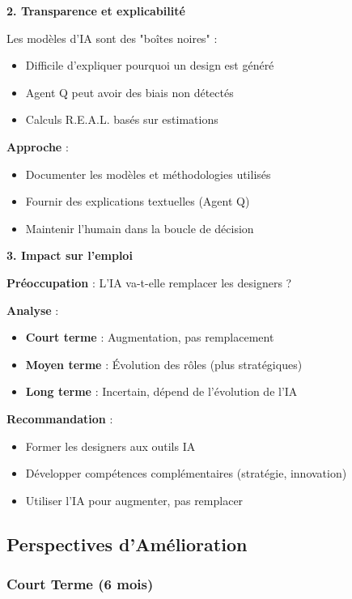 \textbf{2. Transparence et explicabilité}

Les modèles d'IA sont des "boîtes noires" :

\begin{itemize}[leftmargin=*]
    \item Difficile d'expliquer pourquoi un design est généré
    \item Agent Q peut avoir des biais non détectés
    \item Calculs R.E.A.L. basés sur estimations
\end{itemize}

\textbf{Approche} :
\begin{itemize}[leftmargin=*]
    \item Documenter les modèles et méthodologies utilisés
    \item Fournir des explications textuelles (Agent Q)
    \item Maintenir l'humain dans la boucle de décision
\end{itemize}

\textbf{3. Impact sur l'emploi}

\textbf{Préoccupation} : L'IA va-t-elle remplacer les designers ?

\textbf{Analyse} :
\begin{itemize}[leftmargin=*]
    \item \textbf{Court terme} : Augmentation, pas remplacement
    \item \textbf{Moyen terme} : Évolution des rôles (plus stratégiques)
    \item \textbf{Long terme} : Incertain, dépend de l'évolution de l'IA
\end{itemize}

\textbf{Recommandation} :
\begin{itemize}[leftmargin=*]
    \item Former les designers aux outils IA
    \item Développer compétences complémentaires (stratégie, innovation)
    \item Utiliser l'IA pour augmenter, pas remplacer
\end{itemize}

\subsection{Perspectives d'Amélioration}

\subsubsection{Court Terme (6 mois)}

